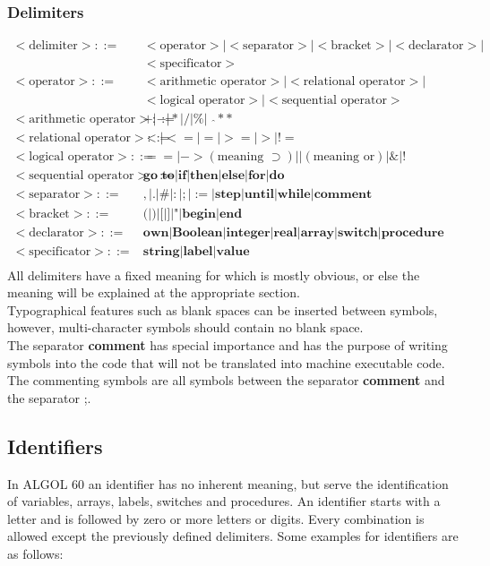 \documentclass{article}
\begin{document}
\subsubsection{Delimiters}
\begin{equation} \label{eq5}
\begin{split}
<\text{delimiter}> ::=&<\text{operator}>|<\text{separator}>|<\text{bracket}>|<\text{declarator}>|\\&<\text{specificator}> \\
<\text{operator}> ::=&<\text{arithmetic operator}>|<\text{relational operator}>|\\&<\text{logical operator}>|<\text{sequential operator}> \\
<\text{arithmetic operator}> ::=&+|-|*|/|\%|\text{ }\hat{} \ast \ast \\
<\text{relational operator}> ::=&<|<=|=|>=|>|!= \\
<\text{logical operator}> ::=&==|->(\text{meaning }\supset)||(\text{meaning or})|\&|!\\
<\text{sequential operator}> ::=&\textbf{go to}|\textbf{if}|\textbf{then}|\textbf{else}|\textbf{for}|\textbf{do}\\
<\text{separator}> ::=&,|.|\#|:|;|:=|\textbf{step}|\textbf{until}|\textbf{while}|\textbf{comment}\\
<\text{bracket}> ::=&\text{(}|\text{)}|\text{[}|\text{]}|\text{"}|\textbf{begin}|\textbf{end}\\
<\text{declarator}> ::=&\textbf{own}|\textbf{Boolean}|\textbf{integer}|\textbf{real}|\textbf{array}|\textbf{switch}|\textbf{procedure}\\
<\text{specificator}> ::=&\textbf{string}|\textbf{label}|\textbf{value}\\
\end{split}
\end{equation}
All delimiters have a fixed meaning for which is mostly obvious, or else the meaning will be explained at the appropriate section.\\
Typographical features such as blank spaces can be inserted between symbols, however, multi-character symbols should contain no blank space.\\
The separator \textbf{comment} has special importance and has the purpose of writing symbols into the code that will not be translated into machine executable code. The commenting symbols are all symbols between the separator \textbf{comment} and the separator ;.


\subsection{Identifiers}
In ALGOL 60 an identifier has no inherent meaning, but serve the identification of variables, arrays, labels, switches and procedures. An identifier starts with a letter and is followed by zero or more letters or digits. Every combination is allowed except the previously defined delimiters. Some examples for identifiers are as follows:\\
\end{document}
